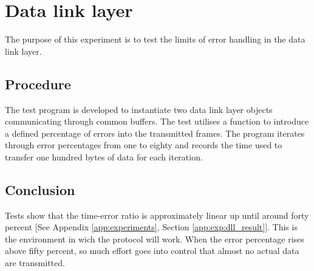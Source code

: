 \section{Data link layer}
The purpose of this experiment is to test the limits of error handling in the
data link layer.

\subsection{Procedure}
The test program  is developed to instantiate two data
link layer objects communicating through common buffers. The test utilises a
function  to introduce a defined percentage of errors
into the transmitted frames. The program iterates through error percentages from
one to eighty and records the time used to transfer one hundred bytes of data
for each iteration.

\subsection{Conclusion}
Tests  show that the time-error ratio is approximately linear up until around
forty percent [See Appendix \ref{app:experiments}, Section \ref{app:exp:dll_result}]. This is the environment in wich the protocol will work. When the
error percentage rises above fifty percent, so much effort goes into control
that almost no actual data are transmitted.

